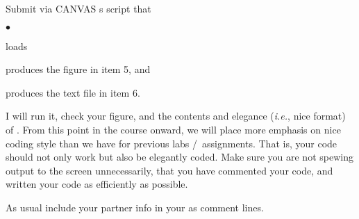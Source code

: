 \documentclass[letterpaper]{article}
\newcounter{lnum}
\newenvironment{abbrevlist}%
  {\begin{list}{$\bullet$}{\setlength{\leftmargin}{2em}%
               \setlength{\itemindent}{0em}%
               \setlength{\itemsep}{0pt}%
               \setlength{\parsep}{0pt}%
               \setlength{\topsep}{2pt}%
               \usecounter{lnum} } }{\end{list}}
\begin{document}

Submit via CANVAS s script  that 
\begin{abbrevlist}
\item loads 
\item produces the figure in item 5, and
\item produces the text file in item 6.
\end{abbrevlist}  
I will run it, check your figure, and the contents and elegance ({\it i.e.}, nice format) of .   From this point in the course onward, we will place more emphasis on nice coding style than we have for previous labs \slash\ assignments. That is, your code should not only work but also be elegantly coded. Make sure you are not spewing output to the screen unnecessarily, that you have commented your code, and written your code as efficiently as possible.

As usual include your partner info in your  as comment lines.
\end{document}
